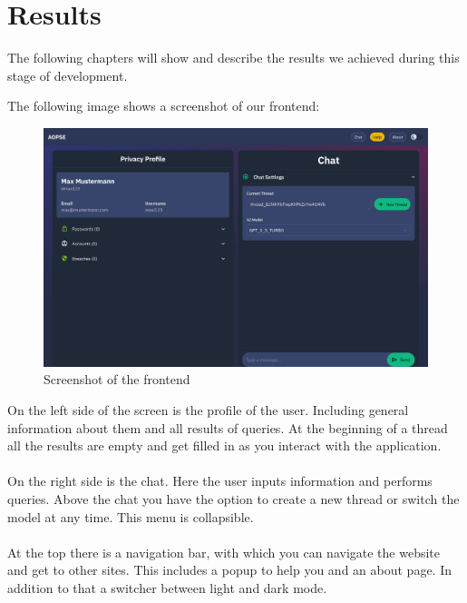 \documentclass[
    a4paper,
    pagesize,
	pdftex,
    12pt,
]{scrartcl}
\begin{document}
\section{Results}
The following chapters will show and describe the results we achieved during this stage of development.

The following image shows a screenshot of our frontend:
\begin{figure}[H]
	\centering
	\includegraphics[width=15cm]{Frontend-final.png}
	\caption{Screenshot of the frontend}
	\label{fig:frondent-final}
\end{figure}
On the left side of the screen is the profile of the user. Including general information about them and all results of queries. At the beginning of a thread all the results are empty and get filled in as you interact with the application.
\\ \\
On the right side is the chat. Here the user inputs information and performs queries. Above the chat you have the option to create a new thread or switch the model at any time. This menu is collapsible.
\\ \\
At the top there is a navigation bar, with which you can navigate the website and get to other sites. This includes a popup to help you and an about page. In addition to that a switcher between light and dark mode.
\end{document}
